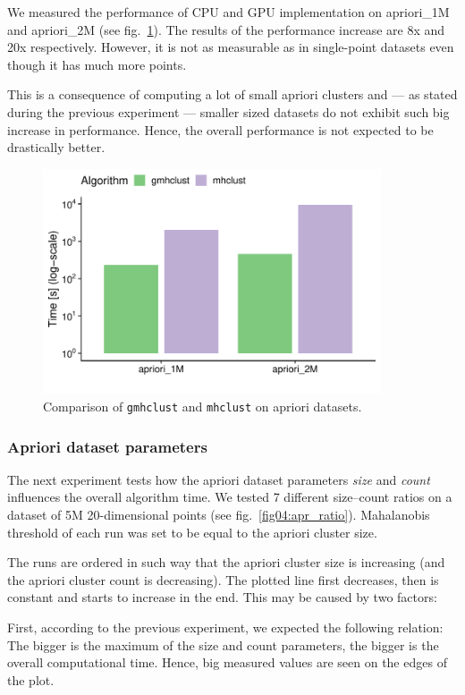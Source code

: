 We measured the performance of CPU and GPU implementation on apriori\_1M and apriori\_2M (see fig.~\ref{fig04:apr_perf_comp}). The results of the performance increase are 8x and 20x respectively. However, it is not as measurable as in single-point datasets even though it has much more points. 

This is a consequence of computing a lot of small apriori clusters and --- as stated during the previous experiment --- smaller sized datasets do not exhibit such big increase in performance. Hence, the overall performance is not expected to be drastically better.

\begin{figure}\centering
	\includegraphics[width=10cm]{img/apriori_perf_comp}
	\caption{Comparison of \texttt{gmhclust} and \texttt{mhclust} on apriori datasets.}
	\label{fig04:apr_perf_comp}
\end{figure}

\subsubsection{Apriori dataset parameters}

The next experiment tests how the apriori dataset parameters \emph{size} and \emph{count} influences the overall algorithm time. We tested 7 different size--count ratios on a dataset of 5M 20-dimensional points (see fig.~\ref{fig04:apr_ratio}). Mahalanobis threshold of each run was set to be equal to the apriori cluster size.

The runs are ordered in such way that the apriori cluster size is increasing (and the apriori cluster count is decreasing). The plotted line first decreases, then is constant and starts to increase in the end. This may be caused by two factors:

First, according to the previous experiment, we expected the following relation: The bigger is the maximum of the size and count parameters, the bigger is the overall computational time. Hence, big measured values are seen on the edges of the plot. 

